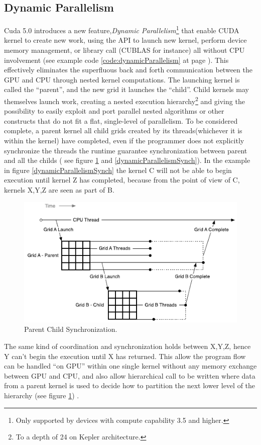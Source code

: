 \subsection{Dynamic Parallelism}\label{DynamicParallelism}
Cuda 5.0 introduces a new feature,\emph{Dynamic
Parallelism}\cite{dynamicParallelism}\footnote{Only supported by devices with
compute capability 3.5 and higher.} that enable  CUDA kernel to create new work, using the API to launch new kernel,
perform device memory management, or library call (CUBLAS for instance) all
without CPU involvement (see example code \ref{code:dynamicParallelism} at page
\pageref{code:dynamicParallelism}).
This effectively eliminates the superfluous back and forth communication between the GPU and CPU through nested kernel computations.
The launching kernel is called the ``parent'', and the new grid it launches the
``child''.
Child kernels may themselves launch work, creating a nested execution
hierarchy\footnote{To a depth of 24 on Kepler architecture.} and giving the
possibility to easily exploit and port parallel nested algorithms or other
constructs that do not fit a flat, single-level of parallelism.
To be considered complete, a parent kernel all child grids created by its
threads(whichever it is within the kernel) have completed, even if the
programmer does not explicitly synchronize the threads the runtime guarantee
synchronization between parent and all the childs ( see figure
\ref{dynamicparallelismParentChild} and \ref{dynamicParallelismSynch}).
In the example in figure \ref{dynamicParallelismSynch} the kernel C will not be
able to begin execution until kernel Z has completed, because from
the point of view of C, kernels X,Y,Z are seen as part of B.
\begin{figure}
\centering
\includegraphics[scale=1.0]{./images/dynamicparallelismParentChild}
\caption{Parent Child Synchronization.}\label{dynamicparallelismParentChild}
\end{figure}
\FloatBarrier 
The same kind of coordination and synchronization holds between X,Y,Z, hence Y
can't begin the execution until X has returned. This allow the program flow can be handled ``on
GPU'' within one single kernel without any memory exchange between GPU and CPU, and also allow hierarchical call to be
written where data from a parent kernel is used to decide how to partition the
next lower level of the hierarchy (see figure
\ref{dynamicparallelismParentChild}) .

